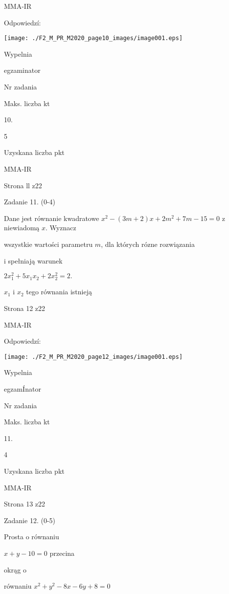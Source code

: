 \documentclass[a4paper,12pt]{article}
\begin{document}
MMA-IR





Odpowiedzí:
\begin{center}
\texttt{[image: ./F2\_M\_PR\_M2020\_page10\_images/image001.eps]}
\end{center}
Wypelnia

egzaminator

Nr zadania

Maks. liczba kt

10.

5

Uzyskana liczba pkt

MMA-IR

Strona ll z22





Zadanie 11. (0-4)

Dane jest równanie kwadratowe $x^{2}-(3m+2)x+2m^{2}+7m-15=0$ z niewiadomą $x$. Wyznacz

wszystkie wartości parametru $m$, dla których rózne rozwiązania

i spełniają warunek

$2x_{1}^{2}+5x_{1}x_{2}+2x_{2}^{2}=2.$

$x_{1}$ i $x_{2}$ tego równania istnieją

Strona 12 z22

MMA-IR





Odpowiedzí:
\begin{center}
\texttt{[image: ./F2\_M\_PR\_M2020\_page12\_images/image001.eps]}
\end{center}
Wypelnia

egzamÍnator

Nr zadania

Maks. liczba kt

11.

4

Uzyskana liczba pkt

MMA-IR

Strona 13 z22





Zadanie 12. (0-5)

Prosta o równaniu

$x+y-10=0$ przecina

okrąg o

równaniu $x^{2}+y^{2}-8x-6y+8=0$
\end{document}
